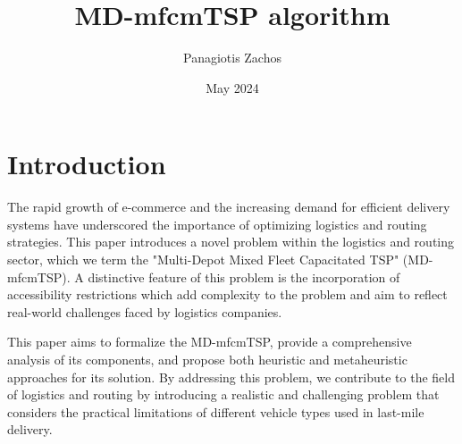 \documentclass[twocolumn]{article}
\title{MD-mfcmTSP algorithm}
\author{Panagiotis Zachos}
\date{May 2024}
\begin{document}
	\maketitle
	
	\section{Introduction}
	The rapid growth of e-commerce and the increasing demand for efficient delivery systems have underscored the importance of optimizing logistics and routing strategies. This paper introduces a novel problem within the logistics and routing sector, which we term the "Multi-Depot Mixed Fleet Capacitated TSP" (MD-mfcmTSP). A distinctive feature of this problem is the incorporation of accessibility restrictions which add complexity to the problem and aim to reflect real-world challenges faced by logistics companies.
	\par
	This paper aims to formalize the MD-mfcmTSP, provide a comprehensive analysis of its components, and propose both heuristic and metaheuristic approaches for its solution. By addressing this problem, we contribute to the field of logistics and routing by introducing a realistic and challenging problem that considers the practical limitations of different vehicle types used in last-mile delivery.
	\par
	
\end{document}
